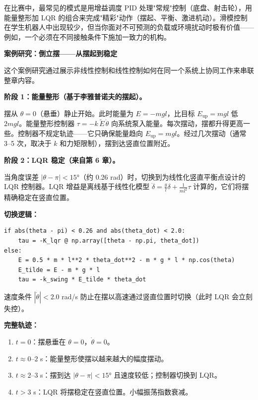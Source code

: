 在比赛中，最常见的模式是用增益调度 PID 处理"常规"控制（底盘、射击轮），用能量整形加 LQR 的组合来完成"精彩"动作（摆起、平衡、激进机动）。滑模控制在学生机器人中出现较少，但当你面对不可预测的负载或环境扰动时极有价值——例如，一个必须在不同接触条件下施加一致力的机构。


\begin{mdframed}[linewidth=1pt, innertopmargin=10pt, innerbottommargin=10pt]
\textbf{案例研究：倒立摆——从摆起到稳定}

\vspace{0.5em}
这个案例研究通过展示非线性控制和线性控制如何在同一个系统上协同工作来串联整章内容。

\textbf{阶段 1：能量整形（基于李雅普诺夫的摆起）。}

摆从 $\theta = 0$（悬垂）静止开始。此时能量为 $E = -mgl$，比目标 $E_{\text{up}} = mgl$ 低 $2mgl$。能量整形控制器 $\tau = -k\,\tilde{E}\,\dot{\theta}$ 向系统泵入能量。每次摆动，摆都升得更高一些。控制器不规定轨迹——它只确保能量趋向 $E_{\text{up}} = mgl$。经过几次摆动（通常 3--5 次，取决于 $k$ 和力矩限制），摆到达竖直位置附近。

\textbf{阶段 2：LQR 稳定（来自第 6 章）。}

当角度误差 $|\theta - \pi| < 15°$（约 0.26 rad）时，切换到为线性化竖直平衡点设计的 LQR 控制器。LQR 增益是离线基于线性化模型 $\ddot{\delta} = \frac{g}{l}\delta + \frac{1}{ml^2}\tau$ 计算的，它们将摆精确稳定在竖直位置。

\textbf{切换逻辑：}

\begin{verbatim}
if abs(theta - pi) < 0.26 and abs(theta_dot) < 2.0:
    tau = -K_lqr @ np.array([theta - np.pi, theta_dot])
else:
    E = 0.5 * m * l**2 * theta_dot**2 - m * g * l * np.cos(theta)
    E_tilde = E - m * g * l
    tau = -k_swing * E_tilde * theta_dot
\end{verbatim}

速度条件 $|\dot{\theta}| < 2.0$ rad/s 防止在摆以高速通过竖直位置时切换（此时 LQR 会立刻失控）。

\textbf{完整轨迹：}
\begin{enumerate}[nosep]
    \item $t = 0$：摆悬垂在 $\theta = 0$，$\dot{\theta} = 0$。
    \item $t \approx 0$--$2$ s：能量整形使摆以越来越大的幅度摆动。
    \item $t \approx 2$--$3$ s：摆到达 $|\theta - \pi| < 15°$ 且速度较低；控制器切换到 LQR。
    \item $t > 3$ s：LQR 将摆稳定在竖直位置。小幅振荡指数衰减。
\end{enumerate}


\end{mdframed}
